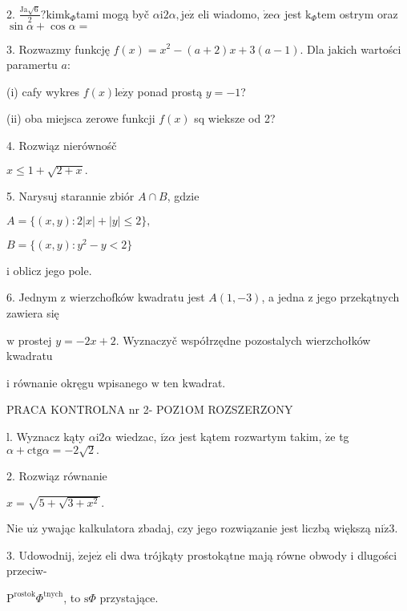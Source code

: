 \documentclass[a4paper,12pt]{article}
\begin{document}
2. $\displaystyle \frac{\mathrm{J}\mathrm{a}\sqrt{6}}{2}?\mathrm{k}\mathrm{i}\mathrm{m}\mathrm{k}_{\Phi}$tami mogą byč $\alpha \mathrm{i}2\alpha, \mathrm{j}\mathrm{e}\dot{\mathrm{z}}$ eli wiadomo, $\dot{\mathrm{z}}\mathrm{e}\alpha$ jest $\mathrm{k}_{\Phi}\mathrm{t}\mathrm{e}\mathrm{m}$ ostrym oraz $\sin\alpha+\cos\alpha=$

$3$. Rozwazmy funkcję $f(x)=x^{2}-(a+2)x+3(a-1)$. Dla jakich wartości paramertu $a$:

(i) cafy wykres $f(x)\mathrm{l}\mathrm{e}\dot{\mathrm{z}}\mathrm{y}$ ponad prostą $y=-1$?

(ii) oba miejsca zerowe funkcji $f(x)$ sq wieksze od 2?

4. Rozwiąz nierównośč

$x\leq 1+\sqrt{2+x}.$

5. Narysuj starannie zbiór $A\cap B$, gdzie

$A=\{(x,y):2|x|+|y|\leq 2\},$

$B=\{(x,y):y^{2}-y<2\}$

$\mathrm{i}$ oblicz jego pole.

6. Jednym $\mathrm{z}$ wierzchofków kwadratu jest $A(1,-3)$, a jedna $\mathrm{z}$ jego przekątnych zawiera się

$\mathrm{w}$ prostej $y = -2x+2$. Wyznaczyč współrzędne pozostalych wierzchołków kwadratu

$\mathrm{i}$ równanie okręgu wpisanego $\mathrm{w}$ ten kwadrat.




PRACA KONTROLNA nr 2- POZ1OM ROZSZERZONY

l. Wyznacz kąty $\alpha \mathrm{i}2\alpha$ wiedzac, $\mathrm{i}\dot{\mathrm{z}}\alpha$ jest kątem rozwartym takim, $\dot{\mathrm{z}}\mathrm{e}$ tg $\alpha+\mathrm{c}\mathrm{t}\mathrm{g}\alpha=-2\sqrt{2}.$

2. Rozwiąz równanie

$x=\sqrt{5+\sqrt{3+x^{2}}}.$

Nie $\mathrm{u}\dot{\mathrm{z}}$ ywając kalkulatora zbadaj, czy jego rozwiązanie jest liczbą większą $\mathrm{n}\mathrm{i}\dot{\mathrm{z}}3.$

3. Udowodnij, $\dot{\mathrm{z}}\mathrm{e}\mathrm{j}\mathrm{e}\dot{\mathrm{z}}$ eli dwa trójkąty prostokątne mają równe obwody $\mathrm{i}$ dlugości przeciw-

$\mathrm{P}^{\mathrm{r}\mathrm{o}\mathrm{s}\mathrm{t}\mathrm{o}\mathrm{k}}\Phi^{\mathrm{t}\mathrm{n}\mathrm{y}\mathrm{c}\mathrm{h}}$, to $\mathrm{s}\Phi$ przystające.
\end{document}
